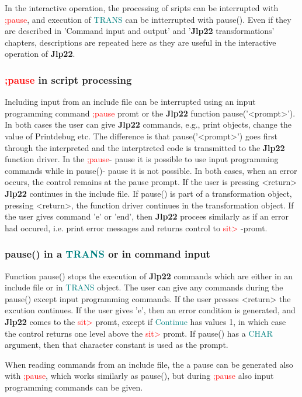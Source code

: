 {In the interactive operation, the processing of sripts can be interrupted with \textcolor{Red}{;pause}, and 
execution of \textcolor{teal}{TRANS} can be intterrupted with \textcolor{VioletRed}{pause}(). Even if they are described in 
'Command input and output' and '\textbf{Jlp22} transformations' chapters, descriptions 
are repeated here as they are useful in the interactive operation of \textbf{Jlp22}. 
\subsubsection{\textcolor{Red}{;pause} in script processing} 
\label{inpupause} 
Including input from an include file can be interrupted using an input programming 
command \textcolor{Red}{;pause} promt or the \textbf{Jlp22} function \textcolor{VioletRed}{pause}('<prompt>'). In both cases 
the user can give \textbf{Jlp22} commands, e.g., print objects, change the value of Printdebug etc. 
The difference is that  \textcolor{VioletRed}{pause}('<prompt>') goes first through the interpreted and the interptreted 
code is transmitted to the \textbf{Jlp22} function driver. In the \textcolor{Red}{;pause}- pause it is possible to 
use input programming commands while in \textcolor{VioletRed}{pause}()- pause it is not possible. In both cases, when 
an error occurs, the control remains at the pause prompt. If the user is pressing 
<return> \textbf{Jlp22} continues in the include file. If \textcolor{VioletRed}{pause}() is part of a transformation object, 
pressing <return>, the function driver continues in the transformation object. 
If the user gives command 'e' or 'end', then \textbf{Jlp22} procees similarly as if an error had occured, 
i.e. print error messages and returns control to \textcolor{Red}{sit>} -promt. 
\subsubsection{\textcolor{VioletRed}{pause}() in a \textcolor{teal}{TRANS} or in command input} 
\label{pause} 
Function \textcolor{VioletRed}{pause}() stops the execution of \textbf{Jlp22} commands which are either in an 
include file or in \textcolor{teal}{TRANS} object. The user can give any commands during the 
\textcolor{VioletRed}{pause}() except input programming commands. 
If the user presses <return> the excution continues. If the user gives 'e', then 
an error condition is generated, and \textbf{Jlp22} comes to the \textcolor{Red}{sit>} promt, except 
if \textcolor{teal}{Continue} has values 1, in which case the control returns one level above 
the \textcolor{Red}{sit>} promt. 
If \textcolor{VioletRed}{pause}()  has a \textcolor{teal}{CHAR} argument, then that character constant is used as 
the prompt. 
\begin{note} 
When reading commands from an include file, the a pause can be generated also 
with \textcolor{Red}{;pause}, which works similarly as \textcolor{VioletRed}{pause}(), but during \textcolor{Red}{;pause} also input programming 
commands can be given. 
\end{note} 
}
